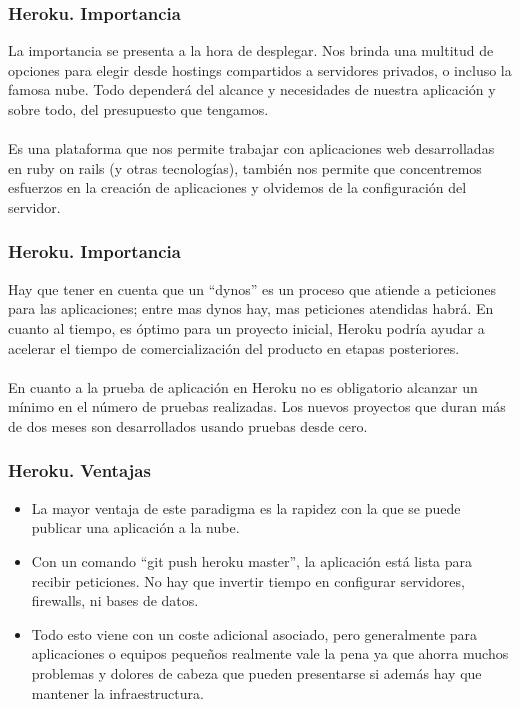 \documentclass{beamer}
\begin{document}
\begin{frame}
\frametitle{Heroku. Importancia}
La importancia se presenta a la hora de desplegar. Nos brinda una multitud de opciones para elegir desde hostings compartidos a servidores privados, o incluso la famosa nube. Todo dependerá del alcance y necesidades de nuestra aplicación y sobre todo, del presupuesto que tengamos.\\ \ \\
Es una plataforma que nos permite trabajar con aplicaciones web desarrolladas en ruby on rails (y otras tecnologías), también nos permite que concentremos esfuerzos en la creación de aplicaciones y olvidemos de la configuración del servidor.\\
\end{frame}

\begin{frame}
\frametitle{Heroku. Importancia}
Hay que tener en cuenta que un “dynos” es un proceso que atiende a peticiones para las aplicaciones; entre mas dynos hay, mas peticiones atendidas habrá.
En cuanto al tiempo, es óptimo para un proyecto inicial, Heroku podría ayudar a acelerar el tiempo de comercialización del producto en etapas posteriores.\\ \ \\
En cuanto a la prueba de aplicación en Heroku no es obligatorio alcanzar un mínimo en el número de pruebas realizadas. Los nuevos proyectos que duran más de dos meses son desarrollados usando pruebas desde cero.
\end{frame}

\begin{frame}
\frametitle{Heroku. Ventajas}
\begin{itemize}
	\item La mayor ventaja de este paradigma es la rapidez con la que se puede publicar una aplicación a la nube.
	\item Con un comando “git push heroku master”, la aplicación está lista para recibir peticiones. No hay que invertir tiempo en configurar servidores, firewalls, ni bases de datos.
	\item Todo esto viene con un coste adicional asociado, pero generalmente para aplicaciones o equipos pequeños realmente vale la pena ya que ahorra muchos problemas y dolores de cabeza que pueden presentarse si además hay que mantener la infraestructura.
\end{itemize}
\end{frame}
\end{document}
